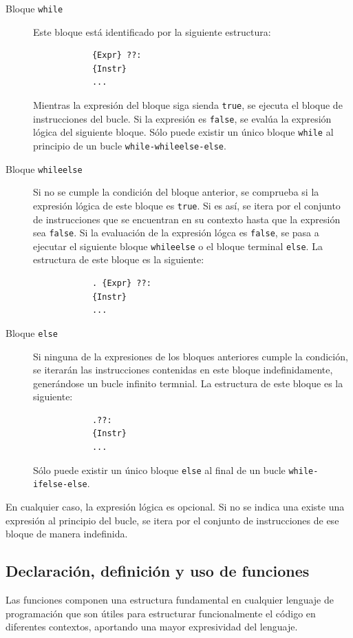 \documentclass[11pt, english]{article}
\begin{document}
	\begin{description}
		\item[Bloque \texttt{while}] Este bloque está identificado por la siguiente estructura:
		\begin{center}
			\begin{lstlisting}
			{Expr} ??:
			{Instr}
			...
			\end{lstlisting}
		\end{center}
		Mientras la expresión del bloque siga sienda \texttt{true}, se ejecuta el bloque de instrucciones del bucle. Si la expresión es \texttt{false}, se evalúa la expresión lógica del siguiente bloque. Sólo puede existir un único bloque \texttt{while} al principio de un bucle \texttt{while-whileelse-else}.
		\item[Bloque \texttt{whileelse}] Si no se cumple la condición del bloque anterior, se comprueba si la expresión lógica de este bloque es \texttt{true}. Si es así, se itera por el conjunto de instrucciones que se encuentran en su contexto hasta que la expresión sea \texttt{false}. Si la evaluación de la expresión lógca es \texttt{false}, se pasa a ejecutar el siguiente bloque \texttt{whileelse} o el bloque terminal \texttt{else}. La estructura de este bloque es la siguiente:
		\begin{center}
			\begin{lstlisting}
			. {Expr} ??:
			{Instr}
			...
			\end{lstlisting}
		\end{center}
		\item[Bloque \texttt{else}] Si ninguna de la expresiones de los bloques anteriores cumple la condición, se iterarán las instrucciones contenidas en este bloque indefinidamente, generándose un bucle infinito termnial. La estructura de este bloque es la siguiente:
		\begin{center}
			\begin{lstlisting}
			.??:
			{Instr}
			...
			\end{lstlisting}
		\end{center}
		Sólo puede existir un único bloque \texttt{else} al final de un bucle \texttt{while-ifelse-else}.
	\end{description}
	
	En cualquier caso, la expresión lógica es opcional. Si no se indica una existe una expresión al principio del bucle, se itera por el conjunto de instrucciones de ese bloque de manera indefinida.
	
	
	\subsection{Declaración, definición y uso de funciones}\label{functions}
	Las funciones componen una estructura fundamental en cualquier lenguaje de programación que son útiles para estructurar funcionalmente el código en diferentes contextos, aportando una mayor expresividad del lenguaje.
	
\end{document}
